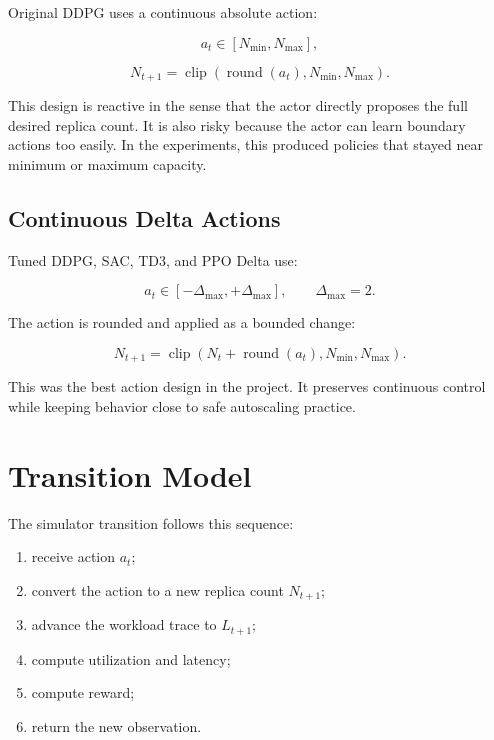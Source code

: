 \documentclass{rapportINPTCLOUD}
\begin{document}
Original DDPG uses a continuous absolute action:

\begin{equation}
a_t \in [N_{\min},N_{\max}],
\end{equation}

\begin{equation}
N_{t+1}
=
\operatorname{clip}
\left(
\operatorname{round}(a_t),
N_{\min},
N_{\max}
\right).
\end{equation}

This design is reactive in the sense that the actor directly proposes the full desired replica count. It is also risky because the actor can learn boundary actions too easily. In the experiments, this produced policies that stayed near minimum or maximum capacity.

\subsection{Continuous Delta Actions}

Tuned DDPG, SAC, TD3, and PPO Delta use:

\begin{equation}
a_t \in [-\Delta_{\max},+\Delta_{\max}],
\qquad \Delta_{\max}=2.
\end{equation}

The action is rounded and applied as a bounded change:

\begin{equation}
N_{t+1}
=
\operatorname{clip}
\left(
N_t + \operatorname{round}(a_t),
N_{\min},
N_{\max}
\right).
\label{eq:delta}
\end{equation}

This was the best action design in the project. It preserves continuous control while keeping behavior close to safe autoscaling practice.

\section{Transition Model}

The simulator transition follows this sequence:

\begin{enumerate}
  \item receive action $a_t$;
  \item convert the action to a new replica count $N_{t+1}$;
  \item advance the workload trace to $L_{t+1}$;
  \item compute utilization and latency;
  \item compute reward;
  \item return the new observation.
\end{enumerate}
\end{document}
